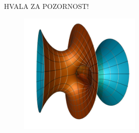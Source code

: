 \documentclass[8pt]{beamer}
\theoremstyle{definition}
\theoremstyle{remark}
\theoremstyle{plain}
\numberwithin{equation}{section}  %
\begin{document}
\begin{frame}
    \begin{center}
        \LARGE \textcolor{red1}{HVALA ZA POZORNOST!}

        \centering
        \begin{figure}
            \includegraphics[width=16em]{../Slike/Costa_Minimal_Surface.jpg}
        \end{figure}
    \end{center}

\end{frame}
\end{document}
